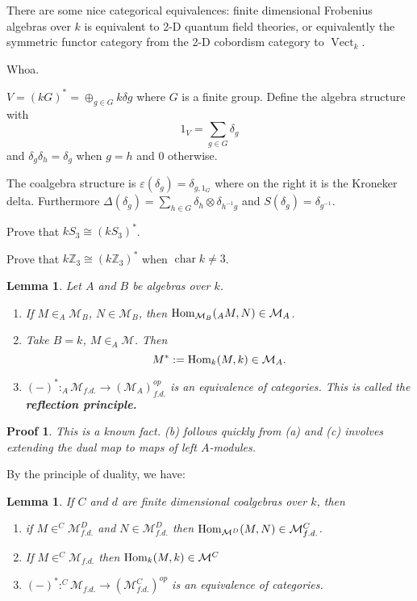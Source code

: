 \documentclass[12pt]{article}
\theoremstyle{break}
\theoremstyle{nonumberbreak}
\theoremstyle{changebreak}
\newtheorem{lem}[thm]{Lemma}
\theoremstyle{break}
\theoremstyle{nonumberbreak}
\newtheorem{prf}{Proof}
\theoremstyle{nonumberplain}
\theoremstyle{change}
\newcommand*{\Z}{
\mathbb{Z}
}
\DeclareMathOperator{\ch}{char}
\newcommand*{\Hom}{\ensuremath\text{Hom}}
\newcommand*{\Vectk}{\operatorname{Vect}_k}
\begin{document}
There are some nice categorical equivalences: finite dimensional Frobenius algebras over $k$ is
equivalent to 2-D quantum field theories, or equivalently the symmetric functor category from the 2-D cobordism category to $\Vectk$.

Whoa.

\begin{ex}
	$V=(kG)^*=\oplus_{g\in G}k\delta g$ where $G$ is a finite group. Define the algebra structure with
	\[1_V=\sum_{g\in G}\delta_g\]
	and $\delta_g\delta_h=\delta_g$ when $g=h$ and 0 otherwise.

	The coalgebra structure is $\varepsilon(\delta_g)=\delta_{g,1_G}$ where on the right it is the Kroneker delta.
	Furthermore $\Delta(\delta_g)=\sum_{h\in G}\delta_h\otimes\delta_{h^{-1}g}$ and $S(\delta_g)=\delta_{g^{-1}}$.
\end{ex}

\begin{prob}
	Prove that $kS_3\cong(kS_3)^*$.
\end{prob}
\begin{prob}
	Prove that $k\Z_3\cong(k\Z_3)^*$ when $\ch k\ne 3$.
\end{prob}

\begin{lem}
	Let $A$ and $B$ be algebras over $k$.
	\begin{enumerate}
		\item If $M\in_A\mathcal{M}_B$, $N\in \mathcal{M}_B$, then $\Hom_{\mathcal{M}_B}(_AM,N)\in\mathcal{M}_A$.
		\item Take $B=k$, $M\in _A\mathcal{M}$. Then
		\[M^*:=\Hom_k(M,k)\in\mathcal{M}_A.\]
		\item $(-)^*:_A\mathcal{M}_{f.d.}\to (\mathcal{M}_A)_{f.d.}^{op}$ is an equivalence of categories. This is called the \textbf{reflection principle.}
	\end{enumerate}
\end{lem}
\begin{prf}
	This is a known fact. (b) follows quickly from (a) and (c) involves extending the dual map to maps of left $A$-modules.
\end{prf}
By the principle of duality, we have:
\begin{lem}
	If $C$ and $d$ are finite dimensional coalgebras over $k$, then
	\begin{enumerate}
		\item if $M\in ^C\mathcal{M}^D_{f.d.}$ and $N\in \mathcal{M}^D_{f.d.}$ then $\Hom_{\mathcal{M}^D}(M,N)\in\mathcal{M}^C_{f.d.}$.
		\item If $M\in ^C\mathcal{M}_{f.d.}$ then $\Hom_k(M,k)\in\mathcal{M}^C$
		\item $(-)^*:^C\mathcal{M}_{f.d.}\to(\mathcal{M}_{f.d.}^C)^{op}$ is an equivalence of categories.
	\end{enumerate}
\end{lem}
\end{document}
